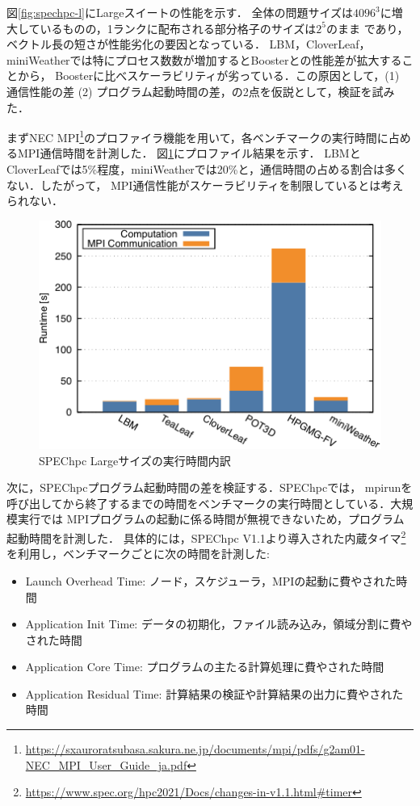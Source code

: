 ﻿\documentclass[submit,techrep,noauthor]{ipsj}
\begin{document}
図\ref{fig:spechpc-l}にLargeスイートの性能を示す．
全体の問題サイズは$4096^3$に増大しているものの，1ランクに配布される部分格子のサイズは$2^5$のまま
であり，ベクトル長の短さが性能劣化の要因となっている．
LBM，CloverLeaf，miniWeatherでは特にプロセス数数が増加するとBoosterとの性能差が拡大することから，
Boosterに比べスケーラビリティが劣っている．この原因として，(1) 通信性能の差 (2)
プログラム起動時間の差，の2点を仮説として，検証を試みた．

まずNEC MPI\footnote{\url{https://sxauroratsubasa.sakura.ne.jp/documents/mpi/pdfs/g2am01-NEC_MPI_User_Guide_ja.pdf}}のプロファイラ機能を用いて，各ベンチマークの実行時間に占めるMPI通信時間を計測した．
図\ref{fig:spechpc-profile1}にプロファイル結果を示す．
LBMとCloverLeafでは5\%程度，miniWeatherでは20\%と，通信時間の占める割合は多くない．したがって，
MPI通信性能がスケーラビリティを制限しているとは考えられない．

\begin{figure}[tb]
  \centering
  \includegraphics{figs/spechpc_profile.pdf}
  \caption{SPEChpc Largeサイズの実行時間内訳}\label{fig:spechpc-profile1}
\end{figure}

次に，SPEChpcプログラム起動時間の差を検証する．SPEChpcでは，
mpirunを呼び出してから終了するまでの時間をベンチマークの実行時間としている．大規模実行では
MPIプログラムの起動に係る時間が無視できないため，プログラム起動時間を計測した．
具体的には，SPEChpc
V1.1より導入された内蔵タイマ\footnote{\url{https://www.spec.org/hpc2021/Docs/changes-in-v1.1.html#timer}}を利用し，ベンチマークごとに次の時間を計測した:

\begin{itemize}
  \item Launch Overhead Time: ノード，スケジューラ，MPIの起動に費やされた時間
  \item Application Init Time: データの初期化，ファイル読み込み，領域分割に費やされた時間
  \item Application Core Time: プログラムの主たる計算処理に費やされた時間
  \item Application Residual Time: 計算結果の検証や計算結果の出力に費やされた時間
\end{itemize}
\end{document}
